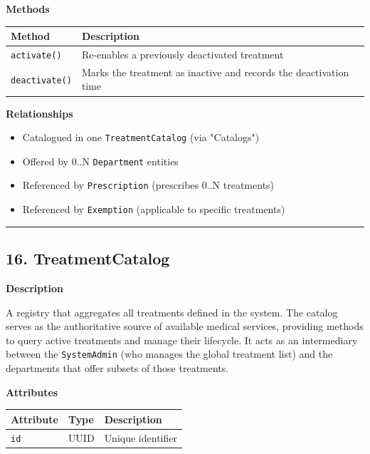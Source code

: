 \documentclass[12pt, a4paper]{article}
\begin{document}
\textbf{Methods}

\begin{center}
\small
\renewcommand{\arraystretch}{1.35}
\begin{tabularx}{\textwidth}{|M|Y|}
\hline
{}
\textbf{Method} & \textbf{Description} \\ \hline
\texttt{activate()} & Re-enables a previously deactivated treatment \\ \hline
\texttt{deactivate()} & Marks the treatment as inactive and records the deactivation time \\ \hline
\end{tabularx}
\end{center}

\textbf{Relationships}

\begin{itemize}
    \item Catalogued in one \texttt{TreatmentCatalog} (via "Catalogs")
    \item Offered by 0..N \texttt{Department} entities
    \item Referenced by \texttt{Prescription} (prescribes 0..N treatments)
    \item Referenced by \texttt{Exemption} (applicable to specific treatments)
\end{itemize}

\par\medskip\hrule\medskip

\subsection{16. TreatmentCatalog}\label{sec:16-treatmentcatalog}

\textbf{Description}

A registry that aggregates all treatments defined in the system. The catalog serves as the authoritative source of available medical services, providing methods to query active treatments and manage their lifecycle. It acts as an intermediary between the \texttt{SystemAdmin} (who manages the global treatment list) and the departments that offer subsets of those treatments.

\textbf{Attributes}

\begin{center}
\small
\renewcommand{\arraystretch}{1.35}
\begin{tabularx}{\textwidth}{|>{\raggedright\arraybackslash}p{3.4cm}|>{\raggedright\arraybackslash}p{3.3cm}|Y|}
\hline
{}
\textbf{Attribute} & \textbf{Type} & \textbf{Description} \\ \hline
\texttt{id} & UUID & Unique identifier \\ \hline
\end{tabularx}
\end{center}
\end{document}

